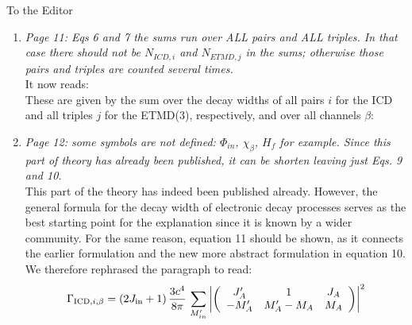 \documentclass[DIN,pagenumber=false,parskip=half,fromalign=left,fromphone=true,fromemail=true,fromurl=false,fromlogo=false,fromrule=false]{scrlttr2}
\begin{document}
\begin{letter}{To the Editor}
\begin{enumerate}
  \item \emph{Page 11:
        Eqs 6 and 7 the sums run over ALL pairs and ALL triples. In that case there should not be $N_{ICD,i}$ and $N_{ETMD,j}$ in the sums; otherwise those pairs and triples are counted several times.}\\
        It now reads:\\
        These are given by the sum over the decay widths of all 
        {\color{blue}{geometrically different}} pairs $i$ for the
        ICD and all {\color{blue}{geometrically different}} triples $j$
        for the ETMD(3),
        respectively, and over all channels $\beta$:

  \item \emph{Page 12:
        some symbols are not defined: $\Phi_{in}$, $\chi_\beta$, $H_f$
        for example.
        Since this part of theory has already been published, it can be shorten
        leaving just Eqs. 9 and 10.}\\
        This part of the theory has indeed been published already. However,
        the general formula for the decay width of electronic decay processes
        serves as the best starting point for the explanation since it is
        known by a wider community. For the same reason, equation 11 should
        be shown, as it connects the earlier formulation and the new more
        abstract formulation in equation 10. We therefore rephrased the
        paragraph to read:\\
        {}
%
\begin{equation}
 \Gamma_{{\rm ICD},i,\beta} = (2J_{\rm in}+1)\, \frac{3c^4}{8\pi}\,
                        \sum\limits_{M_{in}'}
                        \left| \left(
                        \begin{array}{ccc}
                        J_A'  & 1        & J_A\\
                        -M_A' & M_A'-M_A & M_A
                        \end{array}\right) \right|^2

\end{equation}
\end{enumerate}
\end{letter}
\end{document}
